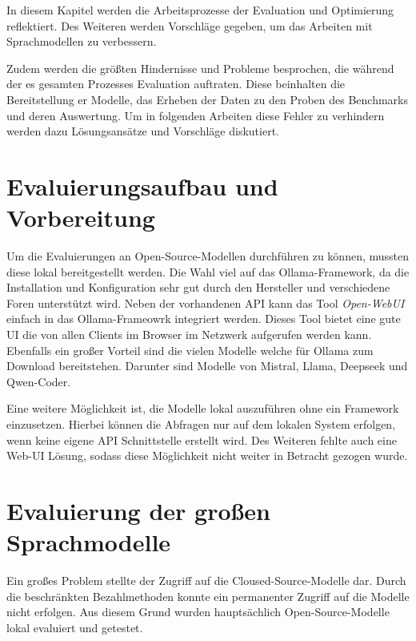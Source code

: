 In diesem Kapitel werden die Arbeitsprozesse der Evaluation und Optimierung reflektiert. Des Weiteren werden Vorschläge gegeben, um das Arbeiten mit Sprachmodellen zu verbessern.\vspace{0.2cm}

Zudem werden die größten Hindernisse und Probleme besprochen, die während der es gesamten Prozesses Evaluation auftraten. Diese beinhalten die Bereitstellung er Modelle, das Erheben der Daten zu den Proben des Benchmarks und deren Auswertung. Um in folgenden Arbeiten diese Fehler zu verhindern werden dazu Lösungsansätze und Vorschläge diskutiert.



\section{Evaluierungsaufbau und Vorbereitung}
Um die Evaluierungen an Open-Source-Modellen durchführen zu können, mussten diese lokal bereitgestellt werden. Die Wahl viel auf das Ollama-Framework, da die Installation und Konfiguration sehr gut durch den Hersteller und verschiedene Foren unterstützt wird. Neben der vorhandenen API kann das Tool \textit{Open-WebUI} einfach in das Ollama-Frameowrk integriert werden. Dieses Tool bietet eine gute UI die von allen Clients im Browser im Netzwerk aufgerufen werden kann. Ebenfalls ein großer Vorteil sind die vielen Modelle welche für Ollama zum Download bereitstehen. Darunter sind Modelle von Mistral, Llama, Deepseek und Qwen-Coder.\vspace{0.2cm}

Eine weitere Möglichkeit ist, die Modelle lokal auszuführen ohne ein Framework einzusetzen. Hierbei können die Abfragen nur auf dem lokalen System erfolgen, wenn keine eigene API Schnittstelle erstellt wird. Des Weiteren fehlte auch eine Web-UI Lösung, sodass diese Möglichkeit nicht weiter in Betracht gezogen wurde.\vspace{0.2cm}



\section{Evaluierung der großen Sprachmodelle}
Ein großes Problem stellte der Zugriff auf die Cloused-Source-Modelle dar. Durch die beschränkten Bezahlmethoden konnte ein permanenter Zugriff auf die Modelle nicht erfolgen. Aus diesem Grund wurden hauptsächlich Open-Source-Modelle lokal evaluiert und getestet.



